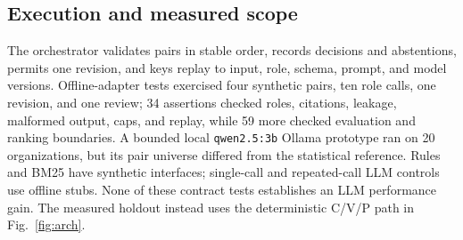 \subsection{Execution and measured scope}
The orchestrator validates pairs in stable order, records decisions and abstentions, permits one revision, and keys replay to input, role, schema, prompt, and model versions. Offline-adapter tests exercised four synthetic pairs, ten role calls, one revision, and one review; 34 assertions checked roles, citations, leakage, malformed output, caps, and replay, while 59 more checked evaluation and ranking boundaries. A bounded local \texttt{qwen2.5:3b} Ollama prototype ran on 20 organizations, but its pair universe differed from the statistical reference. Rules and BM25 have synthetic interfaces; single-call and repeated-call LLM controls use offline stubs. None of these contract tests establishes an LLM performance gain. The measured holdout instead uses the deterministic C/V/P path in Fig.~\ref{fig:arch}.
